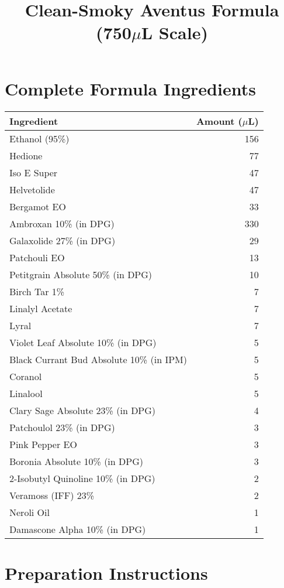 \documentclass{article}
\title{Clean-Smoky Aventus Formula (750$\mu$L Scale)}
\author{}
\date{}
\begin{document}
\maketitle

\section{Complete Formula Ingredients}

\begin{table}[h]
\centering
\begin{tabular}{lr}
\toprule
\textbf{Ingredient} & \textbf{Amount ($\mu$L)} \\
\midrule
Ethanol (95\%) & 156 \\
Hedione & 77 \\
Iso E Super & 47 \\
Helvetolide & 47 \\
Bergamot EO & 33 \\
Ambroxan 10\% (in DPG) & 330 \\
Galaxolide 27\% (in DPG) & 29 \\
Patchouli EO & 13 \\
Petitgrain Absolute 50\% (in DPG) & 10 \\
Birch Tar 1\% & 7 \\
Linalyl Acetate & 7 \\
Lyral & 7 \\
Violet Leaf Absolute 10\% (in DPG) & 5 \\
Black Currant Bud Absolute 10\% (in IPM) & 5 \\
Coranol & 5 \\
Linalool & 5 \\
Clary Sage Absolute 23\% (in DPG) & 4 \\
Patchoulol 23\% (in DPG) & 3 \\
Pink Pepper EO & 3 \\
Boronia Absolute 10\% (in DPG) & 3 \\
2-Isobutyl Quinoline 10\% (in DPG) & 2 \\
Veramoss (IFF) 23\% & 2 \\
Neroli Oil & 1 \\
Damascone Alpha 10\% (in DPG) & 1 \\
\bottomrule
\end{tabular}
\end{table}

\section{Preparation Instructions}
\end{document}
